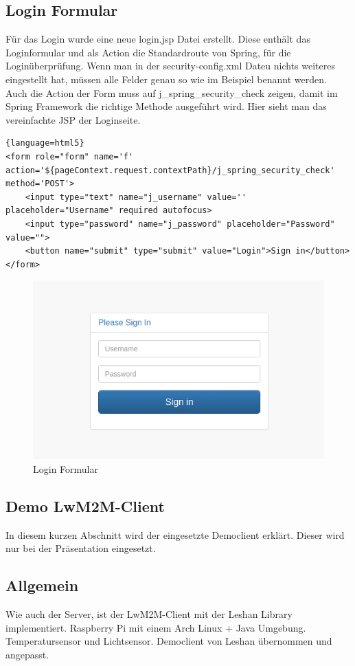 \subsection{Login Formular}
Für das Login wurde eine neue login.jsp Datei erstellt. Diese enthält das Loginformular und als Action die Standardroute von Spring, für die Loginüberprüfung. Wenn man in der security-config.xml Dateu nichts weiteres eingestellt hat, müssen alle Felder genau so wie im Beispiel benannt werden. Auch die Action der Form muss auf j\_spring\_security\_check zeigen, damit im Spring Framework die richtige Methode ausgeführt wird. Hier sieht man das vereinfachte JSP der Loginseite.
\begin{lstlisting}{language=html5}
<form role="form" name='f' action='${pageContext.request.contextPath}/j_spring_security_check' method='POST'>
	<input type="text" name="j_username" value='' placeholder="Username" required autofocus>
	<input type="password" name="j_password" placeholder="Password" value="">
	<button name="submit" type="submit" value="Login">Sign in</button>
</form>
\end{lstlisting}

\begin{figure}[H]
\centering
\includegraphics[scale=0.5]{../04_Realisierung/images/loginform.png}
\caption{Login Formular}
\end{figure}

\newpage

\subsection{Demo LwM2M-Client}
In diesem kurzen Abschnitt wird der eingesetzte Democlient erklärt. Dieser wird nur bei der Präsentation eingesetzt.
\subsection{Allgemein}
Wie auch der Server, ist der LwM2M-Client mit der Leshan Library implementiert. 
Raspberry Pi mit einem Arch Linux + Java Umgebung.
Temperatursensor und Lichtsensor.
Democlient von Leshan übernommen und angepasst.